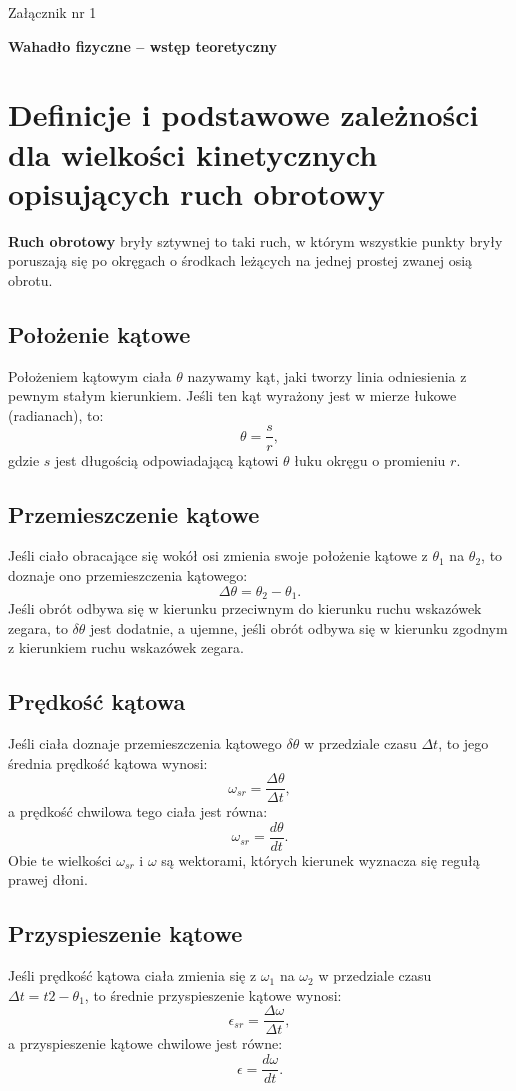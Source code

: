 \documentclass[a4paper,11pt]{article}
\begin{document}
\begin{flushright}
Załącznik nr 1
\end{flushright}

\begin{center}
\begin{LARGE}
\textbf{Wahadło fizyczne -- wstęp teoretyczny}
\end{LARGE}
\end{center}

\section{Definicje i podstawowe zależności dla wielkości kinetycznych opisujących ruch obrotowy}
\textbf{Ruch obrotowy} bryły sztywnej to taki ruch, w którym wszystkie punkty bryły poruszają się po okręgach o środkach leżących na jednej prostej zwanej osią obrotu.  
\subsection{Położenie kątowe}
Położeniem kątowym ciała $\theta$ nazywamy kąt, jaki tworzy linia odniesienia z pewnym stałym kierunkiem. Jeśli ten kąt wyrażony jest w mierze łukowe (radianach), to:
$$\theta = \frac{s}{r},$$
gdzie $s$ jest długością odpowiadającą kątowi $\theta$ łuku okręgu o promieniu $r$. 
\subsection{Przemieszczenie kątowe}
Jeśli ciało obracające się wokół osi zmienia swoje położenie kątowe z $\theta_{1}$ na $\theta_{2}$, to doznaje ono przemieszczenia kątowego:
$$\Delta \theta = \theta_{2} - \theta_{1}.$$
Jeśli obrót odbywa się w kierunku przeciwnym do kierunku ruchu wskazówek zegara, to $\delta \theta$ jest dodatnie, a ujemne, jeśli obrót odbywa się w kierunku zgodnym z kierunkiem ruchu wskazówek zegara.
\subsection{Prędkość kątowa}
Jeśli ciała doznaje przemieszczenia kątowego $\delta \theta$ w przedziale czasu  $\Delta t$, to jego średnia prędkość kątowa wynosi:
$$\omega_{sr} = \dfrac{\Delta \theta}{\Delta t},$$
a prędkość chwilowa tego ciała jest równa:
$$\omega_{sr} = \dfrac{d\theta}{dt}.$$
Obie te wielkości $\omega_{sr}$ i $\omega$ są wektorami, których kierunek wyznacza się regułą prawej dłoni.
\subsection{Przyspieszenie kątowe}
Jeśli prędkość kątowa ciała zmienia się z $\omega_{1}$ na $\omega_{2}$ w przedziale czasu $\Delta t = t{2} - \theta_{1}$, to średnie przyspieszenie kątowe wynosi:
$$\epsilon_{sr} = \dfrac{\Delta \omega}{\Delta t},$$
a przyspieszenie kątowe chwilowe jest równe:
$$\epsilon = \dfrac{d\omega}{dt}.$$
\end{document}

